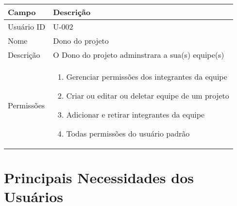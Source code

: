 \noindent
\begin{tabularx}{\textwidth}{| l | X |}
\hline
Campo             & Descrição                                                                                                                                                                           \\ \hline
Usuário ID    & U-002                                                                                                                                                                              \\ \hline
Nome              & Dono do projeto                                                                                                                                                                       \\ \hline
Descrição         & O Dono do projeto adminstrara a sua(s) equipe(s) 
\\ \hline
Permissões &
\begin{enumerate}
    \item Gerenciar permissões dos integrantes da equipe
    \item Criar ou editar ou deletar equipe de um projeto 
    \item Adicionar e retirar integrantes da equipe
    \item Todas permissões do usuário padrão
\end{enumerate}
\\ \hline

\end{tabularx}

\vspace{1cm}

\section{Principais Necessidades dos Usuários}